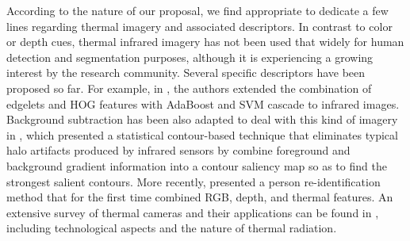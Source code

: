 \documentclass[10pt,twocolumn,letterpaper]{article}
\begin{document}
According to the nature of our proposal, we find appropriate to dedicate a few lines regarding thermal imagery and associated descriptors. In contrast to color or depth cues, thermal infrared imagery has not been used that widely for human detection and segmentation purposes, although it is experiencing a growing interest by the research community. Several specific descriptors have been proposed so far. For example, in \cite{zhang2007pedestrian}, the authors extended the combination of edgelets and HOG features with AdaBoost and SVM cascade to infrared images. Background subtraction has been also adapted to deal with this kind of imagery in \cite{davis2004robust}, which presented a statistical contour-based technique that eliminates typical halo artifacts produced by infrared sensors by combine foreground and background gradient information into a contour saliency map so as to find the strongest salient contours. More recently, \cite{mogelmosetri} presented a person re-identification method that for the first time combined RGB, depth, and thermal features. An extensive survey of thermal cameras and their applications can be found in \cite{gade2014thermal}, including technological aspects and the nature of thermal radiation. 
 
\end{document}
